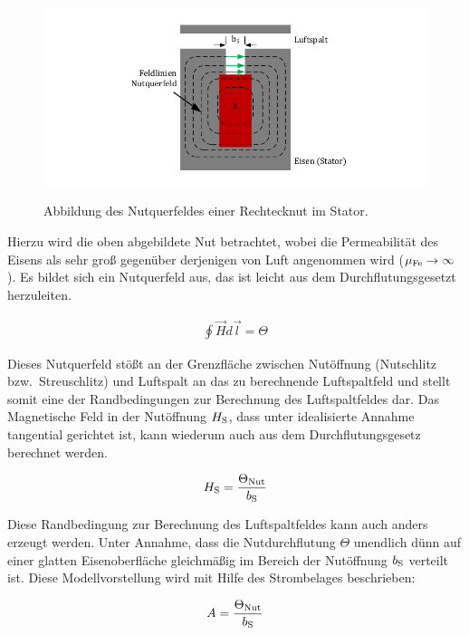 \begin{figure}[!htb]
\centering
\includegraphics{_Bilder/nutquerfeld.pdf}
\label{fig:nutquerfeld}
\caption{Abbildung des Nutquerfeldes einer Rechtecknut im Stator.}
\end{figure}

Hierzu wird die oben abgebildete Nut betrachtet, wobei die Permeabilität des Eisens als sehr groß gegenüber derjenigen von Luft angenommen wird ($\mu_{\mathrm{Fe}} \rightarrow \infty$).
Es bildet sich ein Nutquerfeld aus, das ist leicht aus dem Durchflutungsgesetzt herzuleiten.

\begin{align}
\oint \vec{H}d\vec{l} = \Theta \label{eqn:durchflutungsgesetzt}
\end{align}

Dieses Nutquerfeld stößt an der Grenzfläche zwischen Nutöffnung (Nutschlitz bzw.\ Streuschlitz) und Luftspalt an das zu berechnende Luftspaltfeld und stellt somit eine der Randbedingungen zur Berechnung des Luftspaltfeldes dar.
Das Magnetische Feld in der Nutöffnung $H_{\mathrm{S}}$, dass unter idealisierte Annahme tangential gerichtet ist, kann wiederum auch aus dem Durchflutungsgesetz berechnet werden.

\begin{align}
H_{\mathrm{S}} = \frac{\Theta_{\mathrm{Nut}}}{b_{\mathrm{S}}}
\end{align}

Diese Randbedingung zur Berechnung des Luftspaltfeldes kann auch anders erzeugt werden.
Unter Annahme, dass die Nutdurchflutung $\Theta$ unendlich dünn auf einer glatten Eisenoberfläche gleichmäßig im Bereich der Nutöffnung $b_{\mathrm{S}}$ verteilt ist.
Diese Modellvorstellung wird mit Hilfe des Strombelages beschrieben:

\begin{align}
A = \frac{\Theta_{\mathrm{Nut}}}{b_{\mathrm{S}}}
\end{align}

